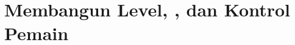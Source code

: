 \documentclass[../../main.tex]{subfiles}
\begin{document}
\chapter{Membangun Level, , dan Kontrol Pemain}
\label{chap:level-physics}
























\ifSubfilesClassLoaded{%
  \clearpage
}{}
\end{document}
